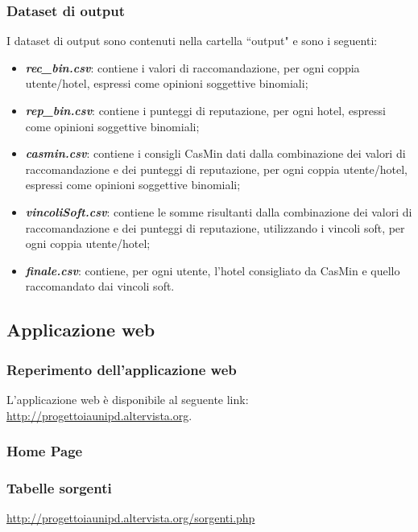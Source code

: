 \documentclass{report}
\begin{document}
		\subsubsection{Dataset di output}
		I dataset di output sono contenuti nella cartella ``output" e sono i seguenti:
		\begin{itemize}
			\item \textbf{\textit{rec\_bin.csv}}: contiene i valori di raccomandazione, per ogni coppia utente/hotel, espressi come opinioni
			 soggettive
			binomiali;
			\item \textbf{\textit{rep\_bin.csv}}: contiene i punteggi di reputazione, per ogni hotel, espressi come opinioni soggettive
			binomiali;
			\item \textbf{\textit{casmin.csv}}: contiene i consigli CasMin dati dalla combinazione dei valori di raccomandazione e dei
			 punteggi di
			reputazione, per ogni coppia utente/hotel, espressi come opinioni soggettive binomiali;
			\item \textbf{\textit{vincoliSoft.csv}}: contiene le somme risultanti dalla combinazione dei valori di raccomandazione e dei
			 punteggi di
			reputazione, utilizzando i vincoli soft, per ogni coppia utente/hotel;
			\item \textbf{\textit{finale.csv}}: contiene, per ogni utente, l'hotel consigliato da CasMin e quello raccomandato dai vincoli
			soft.
		\end{itemize}
		
	\subsection{Applicazione web}
	\subsubsection{Reperimento dell'applicazione web}
	L'applicazione web è disponibile al seguente link: \url{http://progettoiaunipd.altervista.org}.
	
	\subsubsection{Home Page}
	
	\subsubsection{Tabelle sorgenti}

	\url{http://progettoiaunipd.altervista.org/sorgenti.php}
	\newline
	
\end{document}
